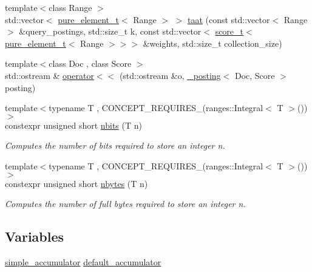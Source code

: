 \begin{DoxyCompactItemize}
{\footnotesize template$<$class Range $>$ }\\std\+::vector$<$ \mbox{\hyperlink{namespaceirk_a1e48b43a3f40d553264380da5e7263c1}{pure\+\_\+element\+\_\+t}}$<$ Range $>$ $>$ \mbox{\hyperlink{namespaceirk_a9bbfe619867ce962c69054e3417b4b11}{taat}} (const std\+::vector$<$ Range $>$ \&query\+\_\+postings, std\+::size\+\_\+t k, const std\+::vector$<$ \mbox{\hyperlink{namespaceirk_a87bce44d1e3fdff0b1b3bb78f2a5f924}{score\+\_\+t}}$<$ \mbox{\hyperlink{namespaceirk_a1e48b43a3f40d553264380da5e7263c1}{pure\+\_\+element\+\_\+t}}$<$ Range $>$$>$$>$ \&weights, std\+::size\+\_\+t collection\+\_\+size)
\item 
{\footnotesize template$<$class Doc , class Score $>$ }\\std\+::ostream \& \mbox{\hyperlink{namespaceirk_a94643c4295628e30b30002810c4a2327}{operator$<$$<$}} (std\+::ostream \&o, \mbox{\hyperlink{structirk_1_1__posting}{\+\_\+posting}}$<$ Doc, Score $>$ posting)
\item 
{\footnotesize template$<$typename T , C\+O\+N\+C\+E\+P\+T\+\_\+\+R\+E\+Q\+U\+I\+R\+E\+S\+\_\+(ranges\+::\+Integral$<$ T $>$()) $>$ }\\constexpr unsigned short \mbox{\hyperlink{namespaceirk_a42f50afae2f0061834dba164c1456908}{nbits}} (T n)
\begin{DoxyCompactList}\small\item\em Computes the number of bits required to store an integer n. \end{DoxyCompactList}\item 
{\footnotesize template$<$typename T , C\+O\+N\+C\+E\+P\+T\+\_\+\+R\+E\+Q\+U\+I\+R\+E\+S\+\_\+(ranges\+::\+Integral$<$ T $>$()) $>$ }\\constexpr unsigned short \mbox{\hyperlink{namespaceirk_ac58a8542fe93e44f62867d97613007ae}{nbytes}} (T n)
\begin{DoxyCompactList}\small\item\em Computes the number of full bytes required to store an integer n. \end{DoxyCompactList}\end{DoxyCompactItemize}
\subsection*{Variables}
\begin{DoxyCompactItemize}
\item 
\mbox{\hyperlink{classirk_1_1simple__accumulator}{simple\+\_\+accumulator}} \mbox{\hyperlink{namespaceirk_ab2909e62b829f7926f8d47d3146d9939}{default\+\_\+accumulator}}
\end{DoxyCompactItemize}


